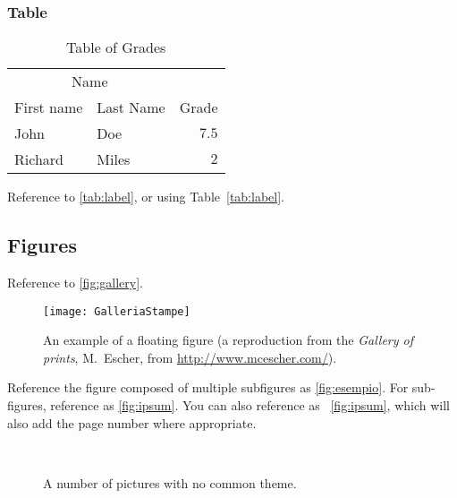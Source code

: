 \subsubsection{Table}

\lipsum[13] %

\begin{table}[hbt]
\caption{Table of Grades}
\centering
\begin{tabular}{llr}
\toprule
\multicolumn{2}{c}{Name} \\
\cmidrule(r){1-2}
First name & Last Name & Grade \\
\midrule
John & Doe & $7.5$ \\
Richard & Miles & $2$ \\
\bottomrule
\end{tabular}
\label{tab:label}
\end{table}

Reference to \autoref{tab:label}, or using Table~\vref{tab:label}.



\subsection{Figures}
\label{sec:instructions:figures}

Reference to \autoref{fig:gallery}.

\begin{figure}[tb]
\centering
\texttt{[image: GalleriaStampe]}
\caption[An example of a floating figure]{
  An example of a floating figure (a reproduction from the
  \emph{Gallery of prints}, M.~Escher,
  from \url{http://www.mcescher.com/}).
}
\label{fig:gallery}
\end{figure}

Reference the figure composed of multiple subfigures as \autoref{fig:esempio}.
For sub-figures, reference as \autoref{fig:ipsum}.
You can also reference as \figureautorefname~\vref{fig:ipsum},
which will also add the page number where appropriate.

\lipsum[5-8] %

\begin{figure}[tb]
\centering
{} \quad
{} \\
 \quad
{}
\caption[A number of pictures.]{A number of pictures with no common theme.}
\label{fig:esempio}
\end{figure}


